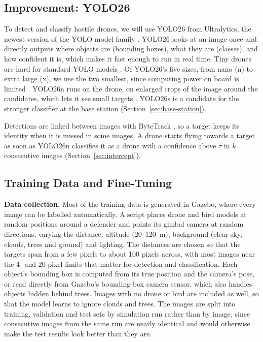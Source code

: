 \subsection{Improvement: YOLO26}
To detect and classify hostile drones, we will use YOLO26 from Ultralytics,
the newest version of the YOLO model family
\cite{jocher2026ultralyticsyolo26unifiedrealtime}. YOLO26 looks at an image
once and directly outputs where objects are (bounding boxes), what they are
(classes), and how confident it is, which makes it fast enough to run in
real time. Tiny drones are hard for standard YOLO models
\cite{zhai2023yolodrone}. Of YOLO26's five sizes, from nano (n) to extra
large (x), we use the two smallest, since computing power on board is
limited \cite{wang2026edge}. YOLO26n runs on
the drone, on enlarged crops of the image around the candidates, which lets
it see small targets \cite{akyon2022sahi}. YOLO26s is a candidate for the
stronger classifier at the base station (Section~\ref{sec:base-station}).

Detections are linked between images with
ByteTrack \cite{zhang2022bytetrack}, so a target keeps its identity when it
is missed in some images. A drone starts flying towards a target as soon as
YOLO26n classifies it as a drone with a confidence above $\tau$ in $k$
consecutive images (Section~\ref{sec:intercept}).

\subsection{Training Data and Fine-Tuning}
\textbf{Data collection.} Most of the training data is generated in Gazebo,
where every image can be labelled automatically. A script places drone and
bird models at random positions around a defender and points its gimbal
camera at random directions, varying the distance, altitude (20--120~m),
background (clear sky, clouds, trees and ground) and lighting. The distances
are chosen so that the targets span from a few pixels to about 100 pixels
across, with most images near the 4- and 20-pixel limits that matter for
detection and classification. Each object's bounding box is computed from
its true position and the camera's pose, or read directly from Gazebo's
bounding-box camera sensor, which also handles objects hidden behind trees.
Images with no drone or bird are included as well, so that the model learns
to ignore clouds and trees. The images are split into training, validation
and test sets by simulation run rather than by image, since consecutive
images from the same run are nearly identical and would otherwise make the
test results look better than they are.

